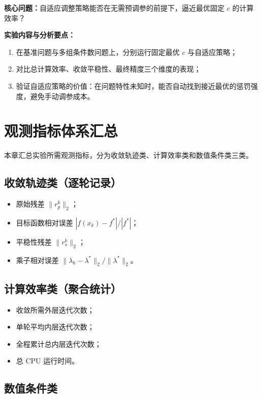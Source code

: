 \documentclass[UTF8]{ctexart}
\numberwithin{figure}{section}
\theoremstyle{definition}
\theoremstyle{examplestyle}
\theoremstyle{remark}
\begin{document}
\textbf{核心问题：}自适应调整策略能否在无需预调参的前提下，逼近最优固定 $c$ 的计算效率？

\textbf{实验内容与分析要点：}
\begin{enumerate}
\item 在基准问题与多组条件数问题上，分别运行固定最优 $c$ 与自适应策略；
\item 对比总计算效率、收敛平稳性、最终精度三个维度的表现；
\item 验证自适应策略的价值：在问题特性未知时，能否自动找到接近最优的惩罚强度，避免手动调参成本。
\end{enumerate}

\section{观测指标体系汇总}
\label{sec:metrics}

本章汇总实验所需观测指标，分为收敛轨迹类、计算效率类和数值条件类三类。

\subsection{收敛轨迹类（逐轮记录）}
\label{sec:metrics-trajectory}

\begin{itemize}
\item 原始残差 $\|r_p^k\|_2$；
\item 目标函数相对误差 $|f(x_k)-f^*|/|f^*|$；
\item 平稳性残差 $\|r_s^k\|_2$；
\item 乘子相对误差 $\|\lambda_k-\lambda^*\|_2/\|\lambda^*\|_2$。
\end{itemize}

\subsection{计算效率类（聚合统计）}
\label{sec:metrics-efficiency}

\begin{itemize}
\item 收敛所需外层迭代次数；
\item 单轮平均内层迭代次数；
\item 全程累计总内层迭代次数；
\item 总 CPU 运行时间。
\end{itemize}

\subsection{数值条件类}
\label{sec:metrics-condition}
\end{document}
